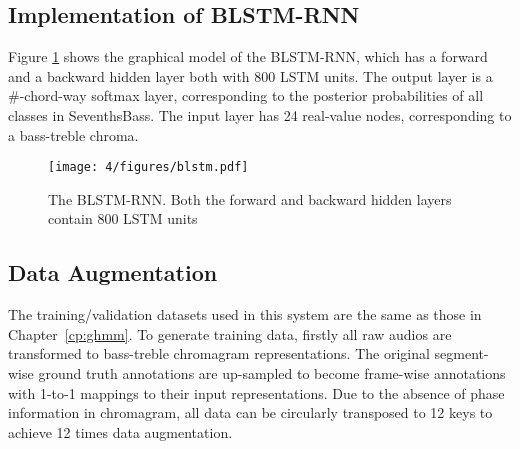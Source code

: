 \subsection{Implementation of BLSTM-RNN}
Figure \ref{fig:4-blstm} shows the graphical model of the BLSTM-RNN, which has a forward and a backward hidden layer both with 800 LSTM units. The output layer is a \#-chord-way softmax layer, corresponding to the posterior probabilities of all classes in SeventhsBass. The input layer has 24 real-value nodes, corresponding to a bass-treble chroma.

\begin{figure}[htb]
\centering
\texttt{[image: 4/figures/blstm.pdf]}
\caption{The BLSTM-RNN. Both the forward and backward hidden layers contain 800 LSTM units}
\label{fig:4-blstm}
\end{figure}

\subsection{Data Augmentation}
The training/validation datasets used in this system are the same as those in Chapter~\ref{cp:ghmm}. To generate training data, firstly all raw audios are transformed to bass-treble chromagram representations. The original segment-wise ground truth annotations are up-sampled to become frame-wise annotations with 1-to-1 mappings to their input representations. Due to the absence of phase information in chromagram, all data can be circularly transposed to 12 keys to achieve 12 times data augmentation.

